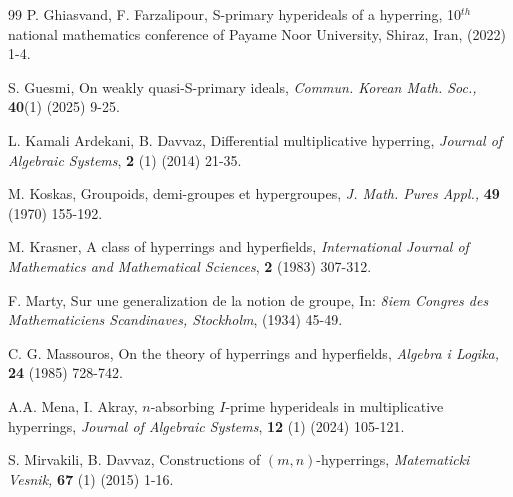 \documentclass[preprint,review,10pt]{amsart}
\theoremstyle{definition}
\theoremstyle{remark}
\numberwithin{equation}{section}
\begin{document}
\begin{thebibliography}{99}
 P. Ghiasvand, F. Farzalipour, S-primary hyperideals of a hyperring, {10$^{th}$national mathematics conference of Payame Noor University, Shiraz, Iran,} (2022) 1-4.
 
 S. Guesmi, On weakly quasi-S-primary ideals, {\it Commun. Korean Math. Soc.,} {\bf 40}(1) (2025) 9-25. 
 

 L. Kamali Ardekani, B. Davvaz, Differential multiplicative hyperring, {\it Journal of Algebraic Systems}, {\bf 2} (1) (2014) 21-35.
 

 
M. Koskas, Groupoids, demi-groupes et hypergroupes, {\it J. Math. Pures
Appl.,} {\bf 49} (1970) 155-192.
 
M. Krasner, A class of hyperrings and hyperﬁelds, {\it International Journal of Mathematics
and Mathematical Sciences}, {\bf 2} (1983) 307-312. 




F. Marty, Sur une generalization de la notion de groupe, In: {\it 8iem Congres des Mathematiciens Scandinaves, Stockholm}, (1934) 45-49.

C. G. Massouros, On the theory of hyperrings and hyperfields, {\it Algebra i Logika,} {\bf 24} (1985) 728-742.

A.A. Mena, I. Akray, $n$-absorbing $I$-prime hyperideals in multiplicative hyperrings, {\it Journal of Algebraic Systems}, {\bf 12} (1) (2024) 105-121.



S. Mirvakili, B. Davvaz, Constructions of $(m,n)$-hyperrings, {\it Matematicki Vesnik,} {\bf  67} (1) (2015) 1-16.


\end{thebibliography}
\end{document}
